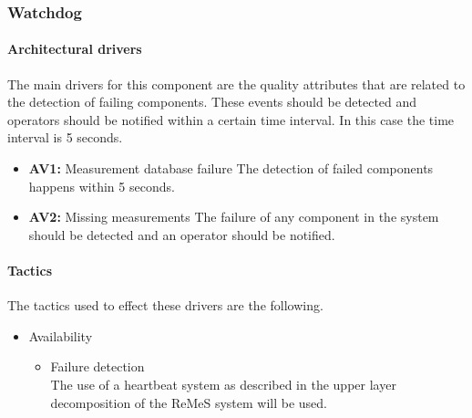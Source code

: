 \subsubsection{Watchdog}
\paragraph{Architectural drivers}
The main drivers for this component are the quality attributes that are related to the detection of failing components. These events should be detected and operators should be notified within  a certain time interval. In this case the time interval is 5 seconds.
\begin{itemize}
	\item \textbf{AV1: } Measurement database failure
	The detection of failed components happens within 5 seconds.
	\item \textbf{AV2: } Missing measurements
	The failure of any component in the system should be detected and an operator should be notified.
\end{itemize}
\paragraph{Tactics}
The tactics used to effect these drivers are the following.
\begin{itemize}
	\item Availability
	\begin{itemize}
		\item Failure detection \\
		The use of a heartbeat system as described in the upper layer decomposition of the ReMeS system will be used.
	\end{itemize}
\end{itemize}
